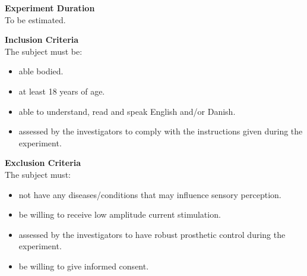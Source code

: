 \textbf{Experiment Duration} \\
To be estimated.

\textbf{Inclusion Criteria} \\
The subject must be:
\vspace{-15pt}
\begin{itemize}
	\item able bodied. %
	\item at least 18 years of age.
	\item able to understand, read and speak English and/or Danish.
	\item assessed by the investigators to comply with the instructions given during the experiment.
\end{itemize}

\textbf{Exclusion Criteria} \\
The subject must:
\vspace{-15pt}
\begin{itemize}
	\item not have any diseases/conditions that may influence sensory perception.
	\item be willing to receive low amplitude current stimulation. 
	\item assessed by the investigators to have robust prosthetic control during the experiment. 
	\item be willing to give informed consent. 
\end{itemize}

